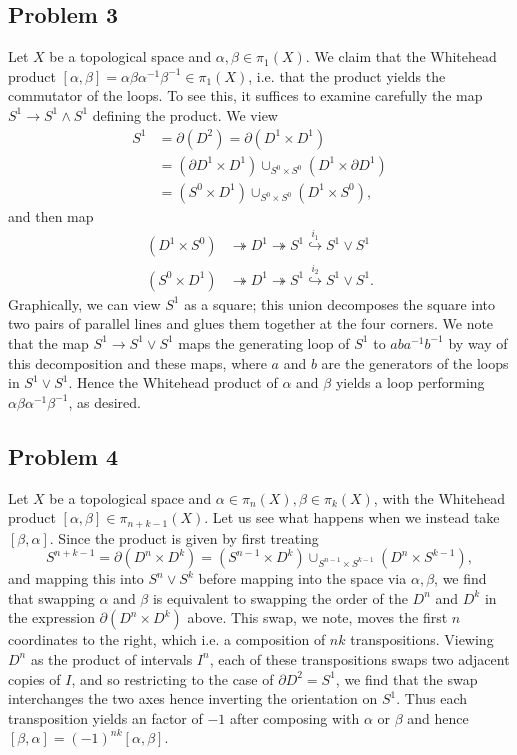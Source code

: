 \documentclass{../mathnotes}
\begin{document}
\subsection*{Problem 3}
Let $X$ be a topological space and $\alpha,\beta\in\pi_1(X)$. We claim that the Whitehead product
$[\alpha,\beta]=\alpha\beta\alpha^{-1}\beta^{-1}\in\pi_1(X)$, i.e. that the product yields the
commutator of the loops. To see this, it suffices to examine carefully the map $S^1\to S^1\wedge S^1$
defining the product. We view
\begin{align*}
    S^1 &= \partial(D^2) = \partial(D^1\times D^1)\\
    &= (\partial D^1\times D^1) \cup_{S^0\times S^0} (D^1\times \partial D^1)\\
    &= (S^0\times D^1) \cup_{S^0\times S^0} (D^1\times S^0),
\end{align*}
and then map
\begin{align*}
    (D^1\times S^0)&\twoheadrightarrow D^1\twoheadrightarrow S^1\overset{i_1}{\hookrightarrow} S^1\vee S^1\\
    (S^0\times D^1)&\twoheadrightarrow D^1\twoheadrightarrow S^1\overset{i_2}{\hookrightarrow} S^1\vee S^1.
\end{align*}
Graphically, we can view $S^1$ as a square; this union decomposes the square into two pairs of parallel
lines and glues them together at the four corners. We note that the map $S^1\to S^1\vee S^1$ maps the
generating loop of $S^1$ to $aba^{-1}b^{-1}$ by way of this decomposition and these maps, where $a$ and $b$
are the generators of the loops in $S^1\vee S^1$. Hence the Whitehead product of $\alpha$ and $\beta$
yields a loop performing $\alpha\beta\alpha^{-1}\beta^{-1}$, as desired.

\subsection*{Problem 4}
Let $X$ be a topological space and $\alpha\in\pi_n(X),\beta\in\pi_k(X)$, with the
Whitehead product $[\alpha,\beta]\in\pi_{n+k-1}(X)$. Let us see what happens when we instead
take $[\beta,\alpha]$. Since the product is given by first treating
\[S^{n+k-1}=\partial(D^n\times D^k)=(S^{n-1}\times D^k)\cup_{S^{n-1}\times S^{k-1}}(D^n\times S^{k-1}),\]
and mapping this into $S^n\vee S^k$ before mapping into the space via $\alpha,\beta$, we find
that swapping $\alpha$ and $\beta$ is equivalent to swapping the order of the $D^n$ and $D^k$
in the expression $\partial(D^n\times D^k)$ above. This swap, we note, moves the first $n$ coordinates
to the right, which i.e. a composition of $nk$ transpositions. Viewing $D^n$ as the product of intervals $I^n$,
each of these transpositions swaps two adjacent copies of $I$, and so restricting to the case of $\partial D^2=S^1$,
we find that the swap interchanges the two axes hence inverting the orientation on $S^1$. Thus
each transposition yields an factor of $-1$ after composing with $\alpha$ or $\beta$ and hence
$[\beta,\alpha]=(-1)^{nk}[\alpha,\beta]$.
\end{document}
